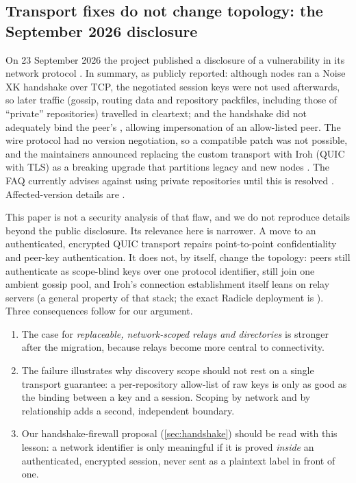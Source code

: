 \documentclass[a4paper,11pt,twoside,parskip=half-,headings=small]{scrartcl}
\begin{document}
\subsection{Transport fixes do not change topology: the September 2026 disclosure}
\label{sec:disclosure}
On 23 September 2026 the project published a disclosure of a vulnerability in its network protocol . In summary, as publicly reported: although nodes ran a Noise XK handshake over TCP, the negotiated session keys were not used afterwards, so later traffic (gossip, routing data and repository packfiles, including those of ``private'' repositories) travelled in cleartext; and the handshake did not adequately bind the peer's , allowing impersonation of an allow-listed peer. The wire protocol had no version negotiation, so a compatible patch was not possible, and the maintainers announced replacing the custom transport with Iroh (QUIC with TLS) as a breaking upgrade that partitions legacy and new nodes . The FAQ currently advises against using private repositories until this is resolved . Affected-version details are .

This paper is not a security analysis of that flaw, and we do not reproduce details beyond the public disclosure. Its relevance here is narrower. A move to an authenticated, encrypted QUIC transport repairs point-to-point confidentiality and peer-key authentication. It does not, by itself, change the topology: peers still authenticate as scope-blind keys over one protocol identifier, still join one ambient gossip pool, and Iroh's connection establishment itself leans on relay servers (a general property of that stack; the exact Radicle deployment is ). Three consequences follow for our argument.
\begin{enumerate}[nosep]
  \item The case for \emph{replaceable, network-scoped relays and directories} is stronger after the migration, because relays become more central to connectivity.
  \item The failure illustrates why discovery scope should not rest on a single transport guarantee: a per-repository allow-list of raw keys is only as good as the binding between a key and a session. Scoping by network and by relationship adds a second, independent boundary.
  \item Our handshake-firewall proposal (\cref{sec:handshake}) should be read with this lesson: a network identifier is only meaningful if it is proved \emph{inside} an authenticated, encrypted session, never sent as a plaintext label in front of one.
\end{enumerate}
\end{document}
